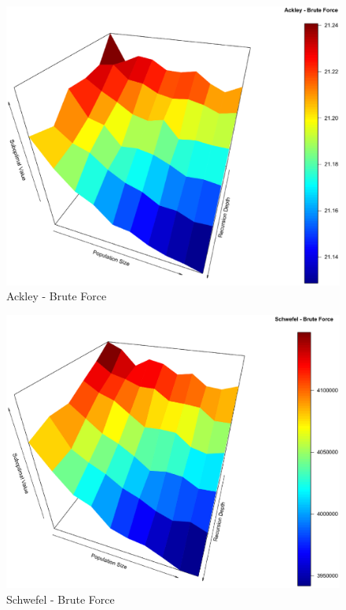 \documentclass[conference]{IEEEtran}
\begin{document}
\begin{figure}[tbp]
\centering
\includegraphics[width=1.0\hsize]{fig21.eps}
\caption{Ackley - Brute Force}
\label{fig07}
\end{figure}

\begin{figure}[tbp]
\centering
\includegraphics[width=1.0\hsize]{fig24.eps}
\caption{Schwefel - Brute Force}
\label{fig08}
\end{figure}
\end{document}
